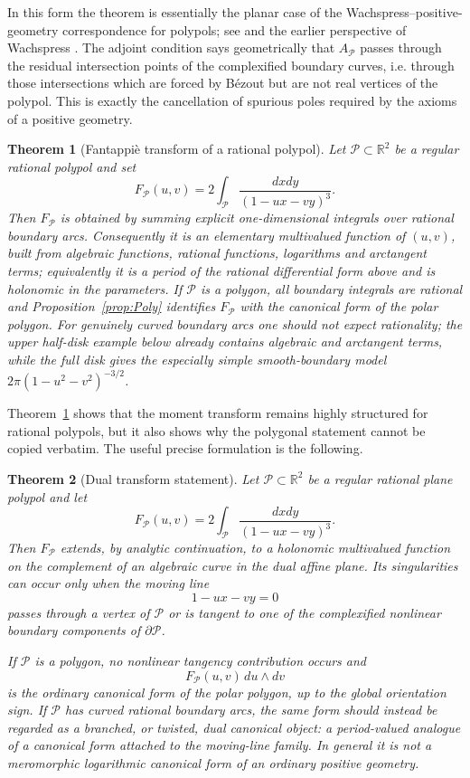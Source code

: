 \documentclass[10pt,a4paper,reqno]{amsart}
\newtheorem{theorem}{Theorem}
\newcommand {\bR} {\mathbb R}
\newcommand {\cP} {\mathcal P}
\theoremstyle{plain}
\theoremstyle{definition}
\begin{document}
In this form the theorem is essentially the planar case of the Wachspress--positive-geometry correspondence for polypols; see \cite{KohnRanestadSinnWinterPolypols} and the earlier perspective of Wachspress \cite{Wa,Wa75}.  The adjoint condition says geometrically that $A_{\cP}$ passes through the residual intersection points of the complexified boundary curves, i.e. through those intersections which are forced by B\'ezout but are not real vertices of the polypol.  This is exactly the cancellation of spurious poles required by the axioms of a positive geometry.

\begin{theorem}[Fantappi\`e transform of a rational polypol]\label{th:GenFucnt}
Let $\cP\subset\bR^2$ be a regular rational polypol and set
$$
F_{\cP}(u,v)=2\int_{\cP}\frac{dxdy}{(1-ux-vy)^3}.
$$
Then $F_{\cP}$ is obtained by summing explicit one-dimensional integrals over rational boundary arcs.  Consequently it is an elementary multivalued function of $(u,v)$, built from algebraic functions, rational functions, logarithms and arctangent terms; equivalently it is a period of the rational differential form above and is holonomic in the parameters.  If $\cP$ is a polygon, all boundary integrals are rational and Proposition~\ref{prop:Poly} identifies $F_{\cP}$ with the canonical form of the polar polygon.  For genuinely curved boundary arcs one should not expect rationality; the upper half-disk example below already contains algebraic and arctangent terms, while the full disk gives the especially simple smooth-boundary model $2\pi(1-u^2-v^2)^{-3/2}$.
\end{theorem}

Theorem~\ref{th:GenFucnt} shows that the moment transform remains highly
structured for rational polypols, but it also shows why the polygonal statement
cannot be copied verbatim.  The useful precise formulation is the following.

\begin{theorem}[Dual transform statement]\label{th:dual-transform}
Let $\cP\subset\bR^2$ be a regular rational plane polypol and let
\[
        F_{\cP}(u,v)=2\int_{\cP}\frac{dxdy}{(1-ux-vy)^3}.
\]
Then $F_{\cP}$ extends, by analytic continuation, to a holonomic multivalued
function on the complement of an algebraic curve in the dual affine plane.  Its
singularities can occur only when the moving line
\[
        1-ux-vy=0
\]
passes through a vertex of $\cP$ or is tangent to one of the complexified
nonlinear boundary components of $\partial\cP$.

If $\cP$ is a polygon, no nonlinear tangency contribution occurs and
\[
        F_{\cP}(u,v)\,du\wedge dv
\]
is the ordinary canonical form of the polar polygon, up to the global orientation
sign.  If $\cP$ has curved rational boundary arcs, the same form should instead
be regarded as a branched, or twisted, dual canonical object: a period-valued
analogue of a canonical form attached to the moving-line family.  In general it
is not a meromorphic logarithmic canonical form of an ordinary positive geometry.
\end{theorem}
\end{document}
